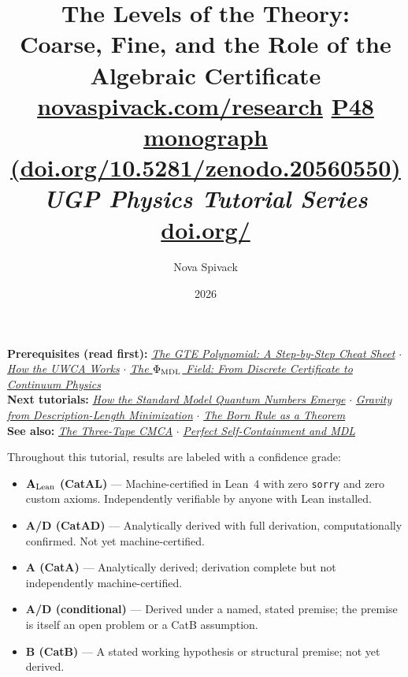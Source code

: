 \documentclass[11pt,a4paper]{article}
\title{\textbf{The Levels of the Theory:}\\[6pt]
\large Coarse, Fine, and the Role of the Algebraic Certificate\\[8pt]
\normalsize
\href{https://novaspivack.com/research}{novaspivack.com/research}\quad
\href{https://doi.org/10.5281/zenodo.20560550}{P48 monograph
  (doi.org/10.5281/zenodo.20560550)}\\[4pt]
\normalsize\textit{UGP Physics Tutorial Series}
\\[2pt]\small\href{https://doi.org/\TutorialDOI}{doi.org/\TutorialDOI}}
\author{Nova Spivack}
\date{2026}
\begin{document}
\setcounter{tocdepth}{2}
\maketitle
\tableofcontents
\newpage

\begin{tcolorbox}[colback=blue!6,colframe=blue!40!black,
  title=\textbf{UGP Physics Tutorial Series}]
\textbf{Prerequisites (read first):} \href{https://doi.org/10.5281/zenodo.20657889}{\emph{The GTE Polynomial: A Step-by-Step
Cheat Sheet}} $\cdot$ \href{https://doi.org/10.5281/zenodo.20657919}{\emph{How the UWCA Works}}
$\cdot$ \href{https://doi.org/10.5281/zenodo.20657885}{\emph{The \boldmath$\Phi_{\rm MDL}$ Field: From Discrete Certificate to
Continuum Physics}}\\[4pt]
\textbf{Next tutorials:} \href{https://doi.org/10.5281/zenodo.20657898}{\emph{How the Standard Model Quantum Numbers Emerge}}
$\cdot$ \href{https://doi.org/10.5281/zenodo.20657870}{\emph{Gravity from Description-Length Minimization}}
$\cdot$ \href{https://doi.org/10.5281/zenodo.20657861}{\emph{The Born Rule as a Theorem}}\\[4pt]
\textbf{See also:} \href{https://doi.org/10.5281/zenodo.20657906}{\emph{The Three-Tape CMCA}} $\cdot$
\href{https://doi.org/10.5281/zenodo.20657895}{\emph{Perfect Self-Containment and MDL}}
\end{tcolorbox}

\begin{tcolorbox}[colback=boxgreen,colframe=green!50!black,
  title=\textbf{Claim-Strength Taxonomy}]
Throughout this tutorial, results are labeled with a confidence grade:
\begin{itemize}[itemsep=2pt]
  \item \textbf{$\mathbf{A}_{\rm Lean}$ (CatAL)} --- Machine-certified in Lean~4 with zero \texttt{sorry} and zero custom axioms.  Independently verifiable by anyone with Lean installed.
  \item \textbf{A/D (CatAD)} --- Analytically derived with full derivation, computationally confirmed.  Not yet machine-certified.
  \item \textbf{A (CatA)} --- Analytically derived; derivation complete but not independently machine-certified.
  \item \textbf{A/D (conditional)} --- Derived under a named, stated premise; the premise is itself an open problem or a CatB assumption.
  \item \textbf{B (CatB)} --- A stated working hypothesis or structural premise; not yet derived.
\end{itemize}
\end{tcolorbox}
\end{document}
